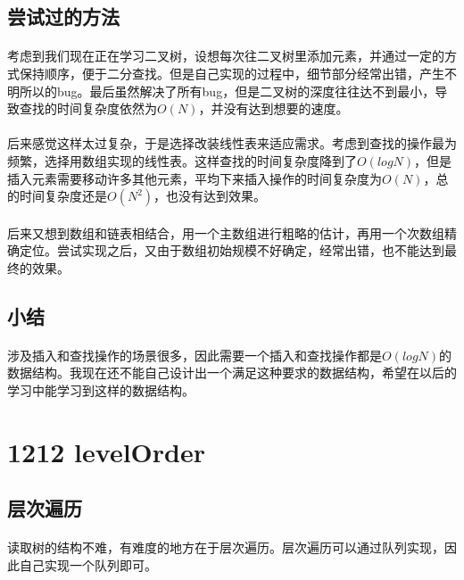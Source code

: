 \documentclass[UTF-8, 12pt]{ctexart}
\begin{document}
    \subsection{尝试过的方法}
    \paragraph{}
    考虑到我们现在正在学习二叉树，设想每次往二叉树里添加元素，并通过一定的方式保持顺序，便于二分查找。但是自己实现的过程中，细节部分经常出错，产生不明所以的bug。最后虽然解决了所有bug，但是二叉树的深度往往达不到最小，导致查找的时间复杂度依然为$O(N)$，并没有达到想要的速度。
    \paragraph{}
    后来感觉这样太过复杂，于是选择改装线性表来适应需求。考虑到查找的操作最为频繁，选择用数组实现的线性表。这样查找的时间复杂度降到了$O(logN)$，但是插入元素需要移动许多其他元素，平均下来插入操作的时间复杂度为$O(N)$，总的时间复杂度还是$O(N^2)$，也没有达到效果。
    \paragraph{}
    后来又想到数组和链表相结合，用一个主数组进行粗略的估计，再用一个次数组精确定位。尝试实现之后，又由于数组初始规模不好确定，经常出错，也不能达到最终的效果。
    
    \subsection{小结}
    \paragraph{}
    涉及插入和查找操作的场景很多，因此需要一个插入和查找操作都是$O(logN)$的数据结构。我现在还不能自己设计出一个满足这种要求的数据结构，希望在以后的学习中能学习到这样的数据结构。
    

\section{1212 levelOrder}
    \subsection{层次遍历}
    \paragraph{}
    读取树的结构不难，有难度的地方在于层次遍历。层次遍历可以通过队列实现，因此自己实现一个队列即可。
    
\end{document}
